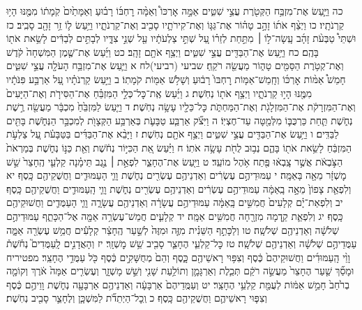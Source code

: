 \documentclass[twoside, openany, parskip=half, 11pt]{book}
\begin{document}
כה וַיַּ֛עַשׂ אֶת־מִזְבַּ֥ח הַקְּטֹ֖רֶת עֲצֵ֣י שִׁטִּ֑ים אַמָּ֣ה אׇרְכּוֹ֩ וְאַמָּ֨ה רׇחְבּ֜וֹ רָב֗וּעַ וְאַמָּתַ֙יִם֙ קֹֽמָת֔וֹ מִמֶּ֖נּוּ הָי֥וּ קַרְנֹתָֽיו׃ כו וַיְצַ֨ף אֹת֜וֹ זָהָ֣ב טָה֗וֹר אֶת־גַּגּ֧וֹ וְאֶת־קִירֹתָ֛יו סָבִ֖יב וְאֶת־קַרְנֹתָ֑יו וַיַּ֥עַשׂ ל֛וֹ זֵ֥ר זָהָ֖ב סָבִֽיב׃ כז וּשְׁתֵּי֩ טַבְּעֹ֨ת זָהָ֜ב עָֽשָׂה־ל֣וֹ ׀ מִתַּ֣חַת לְזֵר֗וֹ עַ֚ל שְׁתֵּ֣י צַלְעֹתָ֔יו עַ֖ל שְׁנֵ֣י צִדָּ֑יו לְבָתִּ֣ים לְבַדִּ֔ים לָשֵׂ֥את אֹת֖וֹ בָּהֶֽם׃ כח וַיַּ֥עַשׂ אֶת־הַבַּדִּ֖ים עֲצֵ֣י שִׁטִּ֑ים וַיְצַ֥ף אֹתָ֖ם זָהָֽב׃ כט וַיַּ֜עַשׂ אֶת־שֶׁ֤מֶן הַמִּשְׁחָה֙ קֹ֔דֶשׁ וְאֶת־קְטֹ֥רֶת הַסַּמִּ֖ים טָה֑וֹר מַעֲשֵׂ֖ה רֹקֵֽחַ׃
שביעי (רביעי)לח א וַיַּ֛עַשׂ אֶת־מִזְבַּ֥ח הָעֹלָ֖ה עֲצֵ֣י שִׁטִּ֑ים חָמֵשׁ֩ אַמּ֨וֹת אׇרְכּ֜וֹ וְחָֽמֵשׁ־אַמּ֤וֹת רׇחְבּוֹ֙ רָב֔וּעַ וְשָׁלֹ֥שׁ אַמּ֖וֹת קֹמָתֽוֹ׃ ב וַיַּ֣עַשׂ קַרְנֹתָ֗יו עַ֚ל אַרְבַּ֣ע פִּנֹּתָ֔יו מִמֶּ֖נּוּ הָי֣וּ קַרְנֹתָ֑יו וַיְצַ֥ף אֹת֖וֹ נְחֹֽשֶׁת׃ ג וַיַּ֜עַשׂ אֶֽת־כׇּל־כְּלֵ֣י הַמִּזְבֵּ֗חַ אֶת־הַסִּירֹ֤ת וְאֶת־הַיָּעִים֙ וְאֶת־הַמִּזְרָקֹ֔ת אֶת־הַמִּזְלָגֹ֖ת וְאֶת־הַמַּחְתֹּ֑ת כׇּל־כֵּלָ֖יו עָשָׂ֥ה נְחֹֽשֶׁת׃ ד וַיַּ֤עַשׂ לַמִּזְבֵּ֙חַ֙ מִכְבָּ֔ר מַעֲשֵׂ֖ה רֶ֣שֶׁת נְחֹ֑שֶׁת תַּ֧חַת כַּרְכֻּבּ֛וֹ מִלְּמַ֖טָּה עַד־חֶצְיֽוֹ׃ ה וַיִּצֹ֞ק אַרְבַּ֧ע טַבָּעֹ֛ת בְּאַרְבַּ֥ע הַקְּצָוֺ֖ת לְמִכְבַּ֣ר הַנְּחֹ֑שֶׁת בָּתִּ֖ים לַבַּדִּֽים׃ ו וַיַּ֥עַשׂ אֶת־הַבַּדִּ֖ים עֲצֵ֣י שִׁטִּ֑ים וַיְצַ֥ף אֹתָ֖ם נְחֹֽשֶׁת׃ ז וַיָּבֵ֨א אֶת־הַבַּדִּ֜ים בַּטַּבָּעֹ֗ת עַ֚ל צַלְעֹ֣ת הַמִּזְבֵּ֔חַ לָשֵׂ֥את אֹת֖וֹ בָּהֶ֑ם נְב֥וּב לֻחֹ֖ת עָשָׂ֥ה אֹתֽוֹ׃
ח וַיַּ֗עַשׂ אֵ֚ת הַכִּיּ֣וֹר נְחֹ֔שֶׁת וְאֵ֖ת כַּנּ֣וֹ נְחֹ֑שֶׁת בְּמַרְאֹת֙ הַצֹּ֣בְאֹ֔ת אֲשֶׁ֣ר צָֽבְא֔וּ פֶּ֖תַח אֹ֥הֶל מוֹעֵֽד׃
ט וַיַּ֖עַשׂ אֶת־הֶחָצֵ֑ר לִפְאַ֣ת ׀ נֶ֣גֶב תֵּימָ֗נָה קַלְעֵ֤י הֶֽחָצֵר֙ שֵׁ֣שׁ מׇשְׁזָ֔ר מֵאָ֖ה בָּאַמָּֽה׃ י עַמּוּדֵיהֶ֣ם עֶשְׂרִ֔ים וְאַדְנֵיהֶ֥ם עֶשְׂרִ֖ים נְחֹ֑שֶׁת וָוֵ֧י הָעַמּוּדִ֛ים וַחֲשֻׁקֵיהֶ֖ם כָּֽסֶף׃ יא וְלִפְאַ֤ת צָפוֹן֙ מֵאָ֣ה בָֽאַמָּ֔ה עַמּוּדֵיהֶ֣ם עֶשְׂרִ֔ים וְאַדְנֵיהֶ֥ם עֶשְׂרִ֖ים נְחֹ֑שֶׁת וָוֵ֧י הָֽעַמּוּדִ֛ים וַחֲשֻׁקֵיהֶ֖ם כָּֽסֶף׃ יב וְלִפְאַת־יָ֗ם קְלָעִים֙ חֲמִשִּׁ֣ים בָּֽאַמָּ֔ה עַמּוּדֵיהֶ֣ם עֲשָׂרָ֔ה וְאַדְנֵיהֶ֖ם עֲשָׂרָ֑ה וָוֵ֧י הָעַמֻּדִ֛ים וַחֲשׁוּקֵיהֶ֖ם כָּֽסֶף׃ יג וְלִפְאַ֛ת קֵ֥דְמָה מִזְרָ֖חָה חֲמִשִּׁ֥ים אַמָּֽה׃ יד קְלָעִ֛ים חֲמֵשׁ־עֶשְׂרֵ֥ה אַמָּ֖ה אֶל־הַכָּתֵ֑ף עַמּוּדֵיהֶ֣ם שְׁלֹשָׁ֔ה וְאַדְנֵיהֶ֖ם שְׁלֹשָֽׁה׃ טו וְלַכָּתֵ֣ף הַשֵּׁנִ֗ית מִזֶּ֤ה וּמִזֶּה֙ לְשַׁ֣עַר הֶֽחָצֵ֔ר קְלָעִ֕ים חֲמֵ֥שׁ עֶשְׂרֵ֖ה אַמָּ֑ה עַמֻּדֵיהֶ֣ם שְׁלֹשָׁ֔ה וְאַדְנֵיהֶ֖ם שְׁלֹשָֽׁה׃ טז כׇּל־קַלְעֵ֧י הֶחָצֵ֛ר סָבִ֖יב שֵׁ֥שׁ מׇשְׁזָֽר׃ יז וְהָאֲדָנִ֣ים לָֽעַמֻּדִים֮ נְחֹ֒שֶׁת֒ וָוֵ֨י הָֽעַמּוּדִ֜ים וַחֲשׁוּקֵיהֶם֙ כֶּ֔סֶף וְצִפּ֥וּי רָאשֵׁיהֶ֖ם כָּ֑סֶף וְהֵם֙ מְחֻשָּׁקִ֣ים כֶּ֔סֶף כֹּ֖ל עַמֻּדֵ֥י הֶחָצֵֽר׃ מפטיריח וּמָסַ֞ךְ שַׁ֤עַר הֶחָצֵר֙ מַעֲשֵׂ֣ה רֹקֵ֔ם תְּכֵ֧לֶת וְאַרְגָּמָ֛ן וְתוֹלַ֥עַת שָׁנִ֖י וְשֵׁ֣שׁ מָשְׁזָ֑ר וְעֶשְׂרִ֤ים אַמָּה֙ אֹ֔רֶךְ וְקוֹמָ֤ה בְרֹ֙חַב֙ חָמֵ֣שׁ אַמּ֔וֹת לְעֻמַּ֖ת קַלְעֵ֥י הֶחָצֵֽר׃ יט וְעַמֻּֽדֵיהֶם֙ אַרְבָּעָ֔ה וְאַדְנֵיהֶ֥ם אַרְבָּעָ֖ה נְחֹ֑שֶׁת וָוֵיהֶ֣ם כֶּ֔סֶף וְצִפּ֧וּי רָאשֵׁיהֶ֛ם וַחֲשֻׁקֵיהֶ֖ם כָּֽסֶף׃ כ וְֽכׇל־הַיְתֵדֹ֞ת לַמִּשְׁכָּ֧ן וְלֶחָצֵ֛ר סָבִ֖יב נְחֹֽשֶׁת׃
\end{document}
